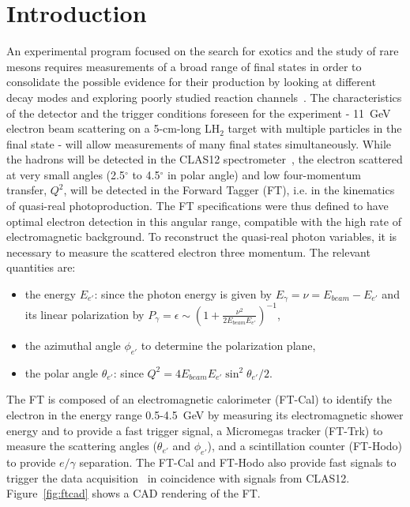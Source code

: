 \section{Introduction}

An experimental program focused on the search for exotics and the study of rare mesons requires measurements
of a broad range of final states in order to consolidate the possible evidence for their production by looking at
different decay modes and exploring poorly studied reaction channels~\cite{mesonex}. The characteristics of the
detector and the trigger conditions foreseen for the experiment - 11~GeV electron beam scattering on a 5-cm-long
LH$_2$ target with multiple particles in the final state - will allow  measurements of many final states simultaneously.
While the hadrons will be detected in the CLAS12 spectrometer~\cite{overview}, the electron scattered at very
small angles (2.5$^\circ$ to 4.5$^\circ$ in polar angle) and low four-momentum transfer, $Q^2$,  will be detected in
the Forward Tagger (FT), i.e. in the kinematics of quasi-real photoproduction. The FT  specifications were thus
defined to have optimal electron detection in this angular range, compatible with the high rate of electromagnetic
background. To reconstruct the  quasi-real photon variables, it is necessary to measure the scattered electron
three momentum. The relevant quantities are:

\begin{itemize}
\item the energy $E_{e'}$: since the photon energy is given by $E_\gamma =\nu=E_{beam}-E_{e'}$ and its linear
  polarization by $P_\gamma=\epsilon\sim\left( 1+\frac{\nu^2}{2 E_{beam} E_{e'}}\right)^{-1}$,
\item the azimuthal angle $\phi_{e'}$ to determine the polarization plane, 
\item the polar angle $\theta_{e'}$: since $Q^2 = 4 E_{beam} E_{e'} \sin^2{\theta_{e'}/2}$.
\end{itemize}

The FT is composed of an electromagnetic calorimeter  (FT-Cal) to identify the electron in the energy range
0.5-4.5~GeV by measuring its electromagnetic shower energy and to provide a fast trigger signal, a Micromegas
tracker (FT-Trk) to measure the scattering angles ($\theta_{e'}$ and $\phi_{e'}$), and a  scintillation counter
(FT-Hodo) to provide $e/\gamma$ separation. The FT-Cal and FT-Hodo also provide fast signals to trigger the
data acquisition~\cite{daq} in coincidence with signals from CLAS12. Figure~\ref{fig:ftcad} shows a CAD rendering
of the FT.

